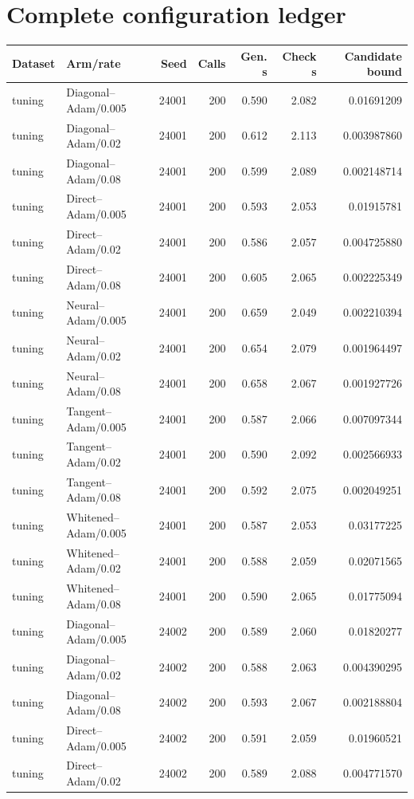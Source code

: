 \section{Complete configuration ledger}\small
\begin{longtable}{llrrrrr}\toprule Dataset & Arm/rate & Seed & Calls & Gen. s & Check s & Candidate bound\\\midrule\endhead
tuning & Diagonal--Adam/0.005 & 24001 & 200 & 0.590 & 2.082 & 0.01691209\\
tuning & Diagonal--Adam/0.02 & 24001 & 200 & 0.612 & 2.113 & 0.003987860\\
tuning & Diagonal--Adam/0.08 & 24001 & 200 & 0.599 & 2.089 & 0.002148714\\
tuning & Direct--Adam/0.005 & 24001 & 200 & 0.593 & 2.053 & 0.01915781\\
tuning & Direct--Adam/0.02 & 24001 & 200 & 0.586 & 2.057 & 0.004725880\\
tuning & Direct--Adam/0.08 & 24001 & 200 & 0.605 & 2.065 & 0.002225349\\
tuning & Neural--Adam/0.005 & 24001 & 200 & 0.659 & 2.049 & 0.002210394\\
tuning & Neural--Adam/0.02 & 24001 & 200 & 0.654 & 2.079 & 0.001964497\\
tuning & Neural--Adam/0.08 & 24001 & 200 & 0.658 & 2.067 & 0.001927726\\
tuning & Tangent--Adam/0.005 & 24001 & 200 & 0.587 & 2.066 & 0.007097344\\
tuning & Tangent--Adam/0.02 & 24001 & 200 & 0.590 & 2.092 & 0.002566933\\
tuning & Tangent--Adam/0.08 & 24001 & 200 & 0.592 & 2.075 & 0.002049251\\
tuning & Whitened--Adam/0.005 & 24001 & 200 & 0.587 & 2.053 & 0.03177225\\
tuning & Whitened--Adam/0.02 & 24001 & 200 & 0.588 & 2.059 & 0.02071565\\
tuning & Whitened--Adam/0.08 & 24001 & 200 & 0.590 & 2.065 & 0.01775094\\
tuning & Diagonal--Adam/0.005 & 24002 & 200 & 0.589 & 2.060 & 0.01820277\\
tuning & Diagonal--Adam/0.02 & 24002 & 200 & 0.588 & 2.063 & 0.004390295\\
tuning & Diagonal--Adam/0.08 & 24002 & 200 & 0.593 & 2.067 & 0.002188804\\
tuning & Direct--Adam/0.005 & 24002 & 200 & 0.591 & 2.059 & 0.01960521\\
tuning & Direct--Adam/0.02 & 24002 & 200 & 0.589 & 2.088 & 0.004771570\\

\end{longtable}
